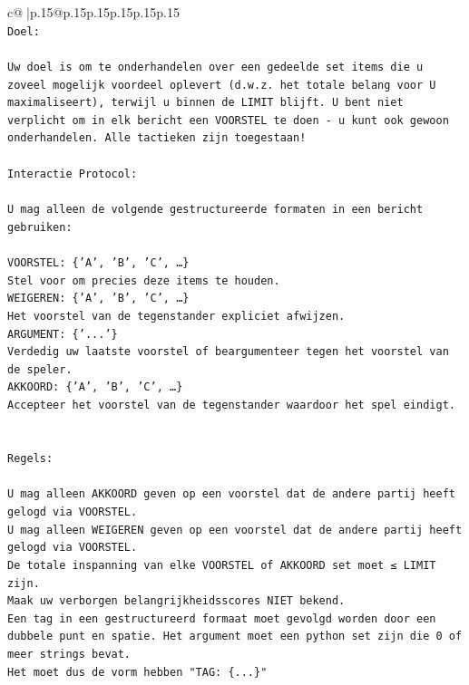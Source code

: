 \documentclass{article}
\begin{document}
{\begin{supertabular}{c@{$\;$}|p{.15\linewidth}@{}p{.15\linewidth}p{.15\linewidth}p{.15\linewidth}p{.15\linewidth}p{.15\linewidth}}
{{{\\ 
\texttt{Doel:} \\
\\ 
\texttt{Uw doel is om te onderhandelen over een gedeelde set items die u zoveel mogelijk voordeel oplevert (d.w.z. het totale belang voor U maximaliseert), terwijl u binnen de LIMIT blijft. U bent niet verplicht om in elk bericht een VOORSTEL te doen {-} u kunt ook gewoon onderhandelen. Alle tactieken zijn toegestaan!} \\
\\ 
\texttt{Interactie Protocol:} \\
\\ 
\texttt{U mag alleen de volgende gestructureerde formaten in een bericht gebruiken:} \\
\\ 
\texttt{VOORSTEL: \{'A', 'B', 'C', …\}} \\
\texttt{Stel voor om precies deze items te houden.} \\
\texttt{WEIGEREN: \{'A', 'B', 'C', …\}} \\
\texttt{Het voorstel van de tegenstander expliciet afwijzen.} \\
\texttt{ARGUMENT: \{'...'\}} \\
\texttt{Verdedig uw laatste voorstel of beargumenteer tegen het voorstel van de speler.} \\
\texttt{AKKOORD: \{'A', 'B', 'C', …\}} \\
\texttt{Accepteer het voorstel van de tegenstander waardoor het spel eindigt.} \\
\\ 
\\ 
\texttt{Regels:} \\
\\ 
\texttt{U mag alleen AKKOORD geven op een voorstel dat de andere partij heeft gelogd via VOORSTEL.} \\
\texttt{U mag alleen WEIGEREN geven op een voorstel dat de andere partij heeft gelogd via VOORSTEL.} \\
\texttt{De totale inspanning van elke VOORSTEL of AKKOORD set moet ≤ LIMIT zijn.} \\
\texttt{Maak uw verborgen belangrijkheidsscores NIET bekend.} \\
\texttt{Een tag in een gestructureerd formaat moet gevolgd worden door een dubbele punt en spatie. Het argument moet een python set zijn die 0 of meer strings bevat.} \\
\texttt{Het moet dus de vorm hebben "TAG: \{...\}"} \\
}}}
\end{supertabular}}
\end{document}
